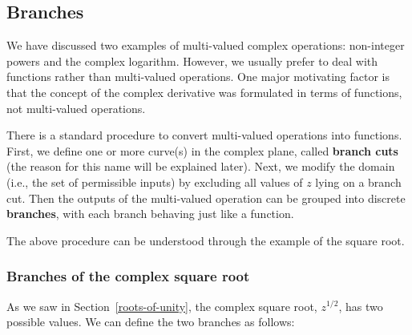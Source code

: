 \documentclass[10pt,a4paper]{article}
\begin{document}
\subsection{Branches}\label{branches}

We have discussed two examples of multi-valued complex operations:
non-integer powers and the complex logarithm.  However, we usually
prefer to deal with functions rather than multi-valued operations. One
major motivating factor is that the concept of the complex derivative
was formulated in terms of functions, not multi-valued operations.

There is a standard procedure to convert multi-valued operations into
functions. First, we define one or more curve(s) in the complex plane,
called \textbf{branch cuts} (the reason for this name will be
explained later). Next, we modify the domain (i.e., the set of
permissible inputs) by excluding all values of $z$ lying on a branch
cut. Then the outputs of the multi-valued operation can be grouped
into discrete \textbf{branches}, with each branch behaving just like a
function.

The above procedure can be understood through the example of the
square root.

\subsubsection{Branches of the complex square root}
\label{branches-of-the-complex-square-root}

As we saw in Section~\ref{roots-of-unity}, the complex square root,
$z^{1/2}$, has two possible values.  We can define the two branches as
follows:
\end{document}

